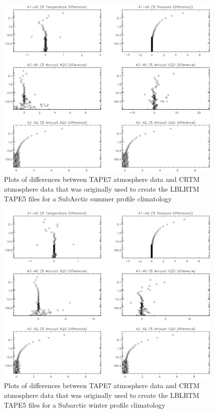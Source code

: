 \begin{figure}[htp]
  \centering{}
  \includegraphics[scale=0.8]{./graphics/Atmosphere_Differences_14.eps}
  \caption{Plots of differences between TAPE7 atmosphere data and CRTM atmosphere data
  that was originally used to create the LBLRTM TAPE5 files for a SubArctic summer profile climatology}
  \label{fig:Differences_Subarctic_summer}
\end{figure}

\begin{figure}[htp]
  \centering{}
  \includegraphics[scale=0.8]{./graphics/Atmosphere_Differences_15.eps}
  \caption{Plots of differences between TAPE7 atmosphere data and CRTM atmosphere data
  that was originally used to create the LBLRTM TAPE5 files for a Subarctic winter profile climatology}
  \label{fig:Differences_Subarctic_winter}
\end{figure}


